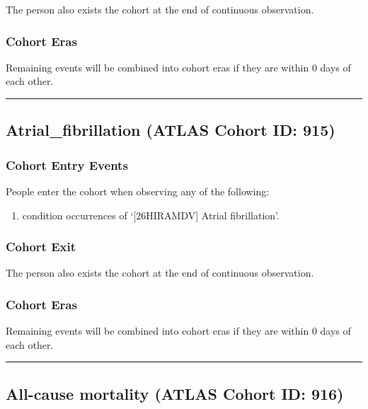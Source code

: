 \documentclass[
  12pt,
]{article}
\providecommand{\tightlist}{%
  \setlength{\itemsep}{0pt}\setlength{\parskip}{0pt}}
\begin{document}
The person also exists the cohort at the end of continuous observation.

\subsubsection{Cohort Eras}\label{cohort-eras-14}

Remaining events will be combined into cohort eras if they are within 0
days of each other.

\begin{center}\rule{0.5\linewidth}{0.5pt}\end{center}

\subsection{Atrial\_fibrillation (ATLAS Cohort ID:
915)}\label{atrial_fibrillation-atlas-cohort-id-915}

\subsubsection{Cohort Entry Events}\label{cohort-entry-events-15}

People enter the cohort when observing any of the following:

\begin{enumerate}
\def\labelenumi{\arabic{enumi}.}
\tightlist
\item
  condition occurrences of `{[}26HIRAMDV{]} Atrial fibrillation'.
\end{enumerate}

\subsubsection{Cohort Exit}\label{cohort-exit-15}

The person also exists the cohort at the end of continuous observation.

\subsubsection{Cohort Eras}\label{cohort-eras-15}

Remaining events will be combined into cohort eras if they are within 0
days of each other.

\begin{center}\rule{0.5\linewidth}{0.5pt}\end{center}

\subsection{All-cause mortality (ATLAS Cohort ID:
916)}\label{all-cause-mortality-atlas-cohort-id-916}
\end{document}
